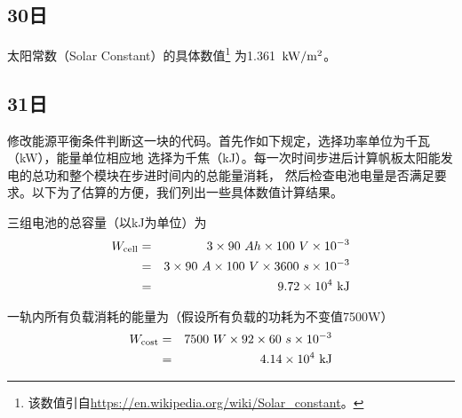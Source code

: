 \subsection{30日}
太阳常数（Solar Constant）的具体数值\footnote{该数值引自\url{https://en.wikipedia.org/wiki/Solar_constant}。}
为1.361~$\rm kW/m^2$。

\subsection{31日}
修改能源平衡条件判断这一块的代码。首先作如下规定，选择功率单位为千瓦（kW），能量单位相应地
选择为千焦（kJ）。每一次时间步进后计算帆板太阳能发电的总功和整个模块在步进时间内的总能量消耗，
然后检查电池电量是否满足要求。以下为了估算的方便，我们列出一些具体数值计算结果。

三组电池的总容量（以kJ为单位）为
\begin{eqnarray}
W_{\rm cell}
 &=& 3\times 90~Ah \times 100~V \times 10^{-3} \nonumber\\
 &=& 3\times 90~A \times 100~V \times 3600~s \times 10^{-3} \nonumber\\
 &=& 9.72 \times 10^4~{\rm kJ}
\end{eqnarray}

一轨内所有负载消耗的能量为（假设所有负载的功耗为不变值7500W）
\begin{eqnarray}
W_{\rm cost}
 &=& 7500~W \times 92 \times 60~s \times 10^{-3} \nonumber\\
 &=& 4.14 \times 10^4~{\rm kJ}
\end{eqnarray}

